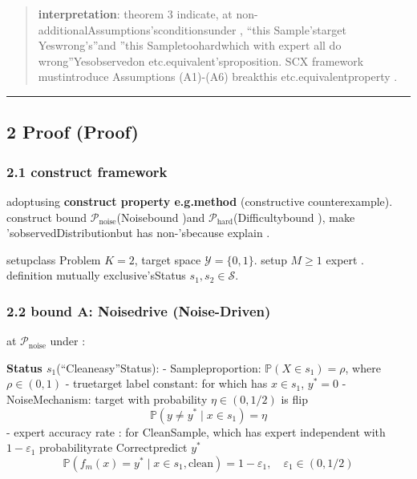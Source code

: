 \documentclass[
  12pt,
]{article}
\begin{document}
\begin{quote}
\textbf{interpretation}: theorem  3
indicate, at non-additionalAssumptions'sconditionsunder , ``this Sample'starget Yeswrong's''and ''this Sampletoohardwhich with expert all do wrong''Yesobservedon etc.equivalent'sproposition. SCX
framework mustintroduce Assumptions (A1)-(A6) breakthis etc.equivalentproperty . 
\end{quote}

\begin{center}\rule{0.5\linewidth}{0.5pt}\end{center}

\subsection{2 Proof (Proof)}\label{ux8bc1ux660e-proof}

\subsubsection{2.1 construct framework }\label{ux6784ux9020ux6846ux67b6}

adoptusing \textbf{construct property e.g.method }(constructive counterexample). construct bound 
\(\mathcal{P}_{\text{noise}}\)(Noisebound )and 
\(\mathcal{P}_{\text{hard}}\)(Difficultybound ), make 'sobservedDistributionbut has non-'sbecause explain . 

setupclass Problem \(K = 2\), target space  \(\mathcal{Y} = \{0, 1\}\). setup
\(M \geq 1\) expert . definition mutually exclusive'sStatus \(s_1, s_2 \in \mathcal{S}\). 

\subsubsection{2.2 bound  A: Noisedrive
(Noise-Driven)}\label{ux4e16ux754c-aux566aux58f0ux9a71ux52a8-noise-driven}

at  \(\mathcal{P}_{\text{noise}}\) under : 

\textbf{Status \(s_1\)}(``Cleaneasy''Status): -
Sampleproportion: \(\mathbb{P}(X \in s_1) = \rho\), where \(\rho \in (0, 1)\) -
truetarget label constant: for which has  \(x \in s_1\), \(y^* = 0\) - NoiseMechanism: target with probability
\(\eta \in (0, 1/2)\) is flip
\[\mathbb{P}(y \neq y^* \mid x \in s_1) = \eta\] -
expert accuracy rate : for CleanSample, which has expert independent with  \(1 - \varepsilon_1\)
probabilityrate Correctpredict \(y^*\)
\[\mathbb{P}(f_m(x) = y^* \mid x \in s_1, \text{clean}) = 1 - \varepsilon_1, \quad \varepsilon_1 \in (0, 1/2)\]
\end{document}
